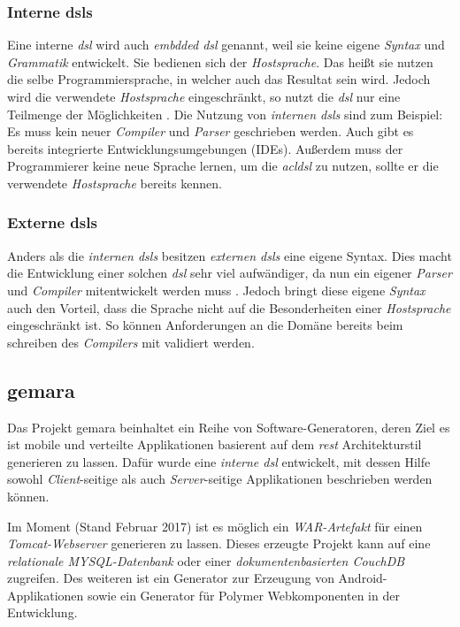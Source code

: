 \subsubsection{Interne \acsp{dsl}} \label{sec:intern}
Eine interne \textit{\acs{dsl}} wird auch \textit{embdded \acs{dsl}} genannt, weil sie keine eigene \textit{Syntax} und \textit{Grammatik} entwickelt. Sie bedienen sich der \textit{Hostsprache}. Das heißt sie nutzen die selbe Programmiersprache, in welcher auch das Resultat sein wird.
Jedoch wird die verwendete \textit{Hostsprache} eingeschränkt, so nutzt die \textit{\acl{dsl}} nur eine Teilmenge der Möglichkeiten \cite{dsl}. Die Nutzung von \textit{internen \acsp{dsl}} sind zum Beispiel: Es muss kein neuer \textit{Compiler} und \textit{Parser} geschrieben werden. Auch gibt es bereits integrierte Entwicklungsumgebungen (IDEs). Außerdem muss der Programmierer keine neue Sprache lernen, um die \textit{acl{dsl}} zu nutzen, sollte er die verwendete \textit{Hostsprache} bereits kennen. 

\subsubsection{Externe \acsp{dsl}} \label{sec:extern}

Anders als die \textit{internen \acsp{dsl}} besitzen \textit{externen \acsp{dsl}} eine eigene Syntax. Dies macht die Entwicklung einer solchen \textit{\acl{dsl}} sehr viel aufwändiger, da nun ein eigener \textit{Parser} und \textit{Compiler} mitentwickelt werden muss \cite{dsl}. Jedoch bringt diese eigene \textit{Syntax} auch den Vorteil, dass die Sprache nicht auf die Besonderheiten einer \textit{Hostsprache} eingeschränkt ist. So können Anforderungen an die Domäne bereits beim schreiben des \textit{Compilers} mit validiert werden.

\subsection{\acf{gemara}}\label{sec:gemara}

Das Projekt \acs{gemara} beinhaltet ein Reihe von Software-Generatoren, deren Ziel es ist mobile und verteilte Applikationen basierent auf dem \textit{\acs{rest}} Architekturstil generieren zu lassen. Dafür wurde eine \textit{interne \acs{dsl}} entwickelt, mit dessen Hilfe sowohl \textit{Client}-seitige als auch \textit{Server}-seitige Applikationen beschrieben werden können.

Im Moment (Stand Februar 2017) ist es möglich ein \textit{WAR-Artefakt} für einen \textit{Tomcat-Webserver} generieren zu lassen. Dieses erzeugte Projekt kann auf eine \textit{relationale MYSQL-Datenbank} oder einer \textit{dokumentenbasierten CouchDB} zugreifen. Des weiteren ist ein Generator zur Erzeugung von Android-Applikationen sowie ein Generator für Polymer Webkomponenten in der Entwicklung.

